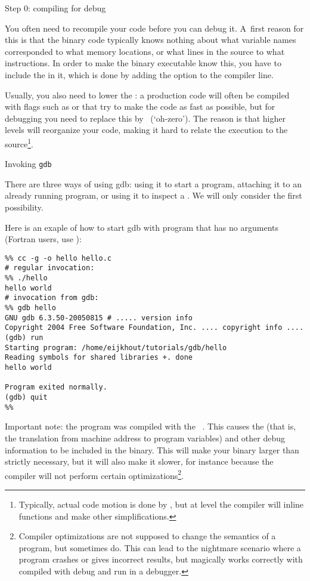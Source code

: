  {Step 0: compiling for debug}

You often need to recompile your code before you can debug it.
A~first reason for this is that the binary code typically knows
nothing about what variable names corresponded to what memory locations,
or what lines in the source to what instructions. In order to make
the binary executable know this, you have to include the 
in it, which is done by adding the  option to the compiler line.

Usually, you also need to lower
the : a production code
will often be compiled with flags such as  or  that
try to make the code as fast as possible, but for debugging you need
to replace this by~ (`oh-zero').  The reason is that higher
levels will reorganize your code, making it hard to relate the
execution to the source\footnote{Typically, actual code motion is done
by , but at level  the compiler will inline functions
and make other simplifications.}.

 {Invoking {\tt gdb}}

There are three ways of using gdb: using it to start a program,
attaching it to an already running program, or using it to inspect a
. We will only consider the first possibility.

Here is an exaple of how to start gdb with program that has no
arguments (Fortran users, use ):
\begin{verbatim}
%% cc -g -o hello hello.c
# regular invocation:
%% ./hello
hello world
# invocation from gdb:
%% gdb hello
GNU gdb 6.3.50-20050815 # ..... version info
Copyright 2004 Free Software Foundation, Inc. .... copyright info ....
(gdb) run
Starting program: /home/eijkhout/tutorials/gdb/hello 
Reading symbols for shared libraries +. done
hello world

Program exited normally.
(gdb) quit
%%
\end{verbatim}

Important note: the program was compiled with the ~. This causes the  (that is, the
translation from machine address to program variables) and other debug
information to be included in the binary. This will make your binary
larger than strictly necessary, but it will also make it slower, for
instance because the compiler will not perform certain
optimizations\footnote{Compiler optimizations are not supposed to
  change the semantics of a program, but sometimes do. This can lead
  to the nightmare scenario where a program crashes or gives incorrect
  results, but magically works correctly with compiled with debug and
  run in a debugger.}.


